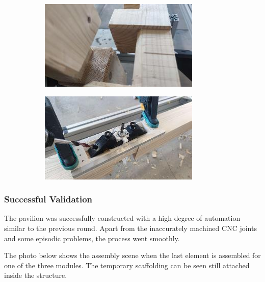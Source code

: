 \documentclass[11pt]{book}
\begin{document}
\begin{figure}[H]
\centering
\begin{subfigure}[b]{0.45\textwidth}
\centering
\includegraphics[width=\textwidth]{./images/image28.jpeg}
\end{subfigure}
\hfill
\begin{subfigure}[b]{0.45\textwidth}
\centering
\includegraphics[width=\textwidth]{./images/image29.jpeg}
\end{subfigure}
\end{figure}


\vspace{1\baselineskip}
\subsubsection{Successful Validation}

The pavilion was successfully constructed with a high degree of automation similar to the previous round. Apart from the inaccurately machined CNC joints and some episodic problems, the process went smoothly. 

The photo below shows the assembly scene when the last element is assembled for one of the three modules. The temporary scaffolding can be seen still attached inside the structure. 
\end{document}
